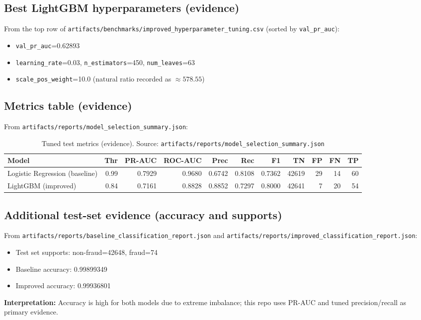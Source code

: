 \documentclass[11pt]{article}
\newcommand{\code}[1]{\texttt{#1}}
\begin{document}
\subsection{Best LightGBM hyperparameters (evidence)}
From the top row of \code{artifacts/benchmarks/improved_hyperparameter_tuning.csv} (sorted by \code{val_pr_auc}):
\begin{itemize}
  \item \code{val_pr_auc}=0.62893
  \item \code{learning_rate}=0.03, \code{n_estimators}=450, \code{num_leaves}=63
  \item \code{scale_pos_weight}=10.0 (natural ratio recorded as \(\approx 578.55\))
\end{itemize}

\subsection{Metrics table (evidence)}
From \code{artifacts/reports/model_selection_summary.json}:

\begin{table}[H]
  \centering
  \begin{tabular}{lrrrrrrrrrr}
    \toprule
    Model & Thr & PR-AUC & ROC-AUC & Prec & Rec & F1 & TN & FP & FN & TP \\
    \midrule
    Logistic Regression (baseline) & 0.99 & 0.7929 & 0.9680 & 0.6742 & 0.8108 & 0.7362 & 42619 & 29 & 14 & 60 \\
    LightGBM (improved) & 0.84 & 0.7161 & 0.8828 & 0.8852 & 0.7297 & 0.8000 & 42641 & 7 & 20 & 54 \\
    \bottomrule
  \end{tabular}
  \caption{Tuned test metrics (evidence). Source: \code{artifacts/reports/model_selection_summary.json}}
\end{table}

\subsection{Additional test-set evidence (accuracy and supports)}
From \code{artifacts/reports/baseline_classification_report.json} and \code{artifacts/reports/improved_classification_report.json}:
\begin{itemize}
  \item Test set supports: non-fraud=42648, fraud=74
  \item Baseline accuracy: 0.99899349
  \item Improved accuracy: 0.99936801
\end{itemize}
\textbf{Interpretation:} Accuracy is high for both models due to extreme imbalance; this repo uses PR-AUC and tuned precision/recall as primary evidence.
\end{document}
